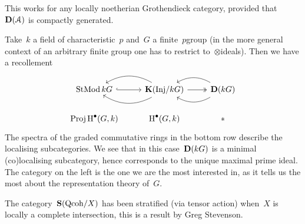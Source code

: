 \documentclass[10pt,a4paper]{article}
\begin{document}
\begin{remark}
  This works for any locally noetherian Grothendieck category, provided that~$\mathbf{D}(\mathcal{A})$ is compactly generated.
\end{remark}

\begin{example}
  Take~$k$ a field of characteristic~$p$ and~$G$ a finite~$p$\dash group (in the more general context of an arbitrary finite group one has to restrict to~$\otimes$\dash ideals). Then we have a recollement
  \begin{equation}
    \begin{tikzcd}
      \StMod kG \arrow[hook]{r} & \KKK(\Inj/kG) \arrow[bend right, swap]{l} \arrow[bend left]{l} \arrow[two heads]{r} & \derived(kG) \arrow[bend right, swap]{l} \arrow[bend left]{l} \\
      \Proj\HH^\bullet(G,k) & \HH^\bullet(G,k) & *
    \end{tikzcd}
  \end{equation}
  The spectra of the graded commutative rings in the bottom row describe the localising subcategories. We see that in this case~$\mathbf{D}(kG)$ is a minimal (co)localising subcategory, hence corresponds to the unique maximal prime ideal. The category on the left is the one we are the most interested in, as it tells us the most about the representation theory of~$G$.
\end{example}

\begin{example}
  The category~$\operatorname{\mathbf{S}}(\mathrm{Qcoh}/X)$ has been stratified (via tensor action) when~$X$ is locally a complete intersection, this is a result by Greg Stevenson.
\end{example}
\end{document}

